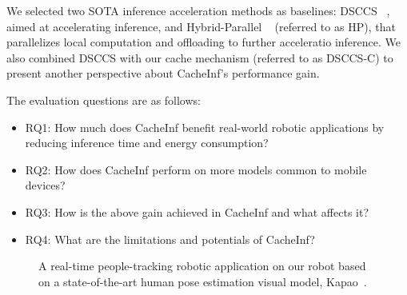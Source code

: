 We selected two SOTA inference acceleration methods as baselines: DSCCS ~\cite{liang2023dnn}, aimed at accelerating inference, and Hybrid-Parallel ~\cite{sun2024hybridparallel} (referred to as HP), that parallelizes local computation and offloading to further acceleratio inference. 
We also combined DSCCS with our cache mechanism (referred to as DSCCS-C) to present another perspective about CacheInf's performance gain.

The evaluation questions are as follows:
\begin{itemize}
    \item RQ1: How much does CacheInf benefit real-world robotic applications by reducing inference time and energy consumption?
    \item RQ2: How does CacheInf perform on more models common to mobile devices?
    \item RQ3: How is the above gain achieved in CacheInf and what affects it?
    \item RQ4: What are the limitations and potentials of CacheInf?
\end{itemize}

\begin{figure}[!t]
    \centering
    \hfil
    \caption{A real-time people-tracking robotic application on our robot based on a state-of-the-art human pose estimation visual model, Kapao~\cite{kapao}.}
    \label{fig:kapao}
\end{figure}

